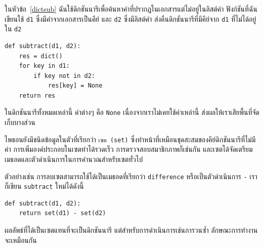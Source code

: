 ในหัวข้อ~\ref{dictsub} ฉันใช้ดิกชันนารีเพื่อค้นหาคำที่ปรากฏในเอกสารแต่ไม่อยู่ในลิสต์คำ ฟังก์ชันที่ฉันเขียนใช้ {\tt d1} 
ซึ่งมีคำจากเอกสารเป็นคีย์ และ {\tt d2} ซึ่งมีลิสต์คำ ส่งคืนดิกชันนารีที่มีคีย์จาก {\tt d1} ที่ไม่ได้อยู่ใน {\tt d2}


\begin{verbatim}
def subtract(d1, d2):
    res = dict()
    for key in d1:
        if key not in d2:
            res[key] = None
    return res
\end{verbatim}
%
ในดิกชันนารีทั้งหมดเหล่านี้ ค่าต่างๆ คือ {\tt None} เนื่องจากเราไม่เคยใช้ค่าเหล่านี้ ส่งผลให้เราเสียพื้นที่จัดเก็บบางส่วน

ไพธอนยังมีชนิดข้อมูลในตัวที่เรียกว่า {\tt เซต (set)} ซึ่งทำหน้าที่เหมือนชุดสะสมของคีย์ดิกชันนารีที่ไม่มีค่า 
การเพิ่มองค์ประกอบในเซตทำได้รวดเร็ว การตรวจสอบสมาชิกภาพก็เช่นกัน และเซตได้จัดเตรียมเมธอดและตัวดำเนินการในการคำนวณสำหรับเซตทั่วไป

ตัวอย่างเช่น การลบเซตสามารถใช้ได้เป็นเมธอดที่เรียกว่า {\tt difference} หรือเป็นตัวดำเนินการ {\tt -} เราก็เขียน {\tt subtract} ใหม่ได้ดังนี้

\begin{verbatim}
def subtract(d1, d2):
    return set(d1) - set(d2)
\end{verbatim}
%
ผลลัพธ์ที่ได้เป็นเซตแทนที่จะเป็นดิกชันนารี แต่สำหรับการดำเนินการเช่นการวนซ้ำ ลักษณะการทำงานจะเหมือนกัน


